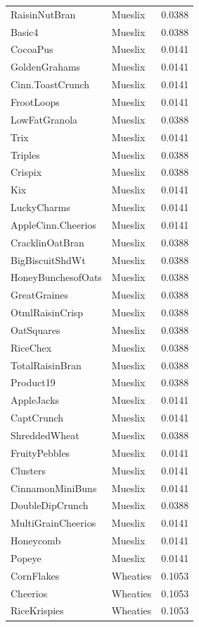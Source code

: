 \begin{longtable}{llr}
RaisinNutBran & Mueslix & 0.0388 \\
Basic4 & Mueslix & 0.0388 \\
CocoaPus & Mueslix & 0.0141 \\
GoldenGrahams & Mueslix & 0.0141 \\
Cinn.ToastCrunch & Mueslix & 0.0141 \\
FrootLoops & Mueslix & 0.0141 \\
LowFatGranola & Mueslix & 0.0388 \\
Trix & Mueslix & 0.0141 \\
Triples & Mueslix & 0.0388 \\
Crispix & Mueslix & 0.0388 \\
Kix & Mueslix & 0.0141 \\
LuckyCharms & Mueslix & 0.0141 \\
AppleCinn.Cheerios & Mueslix & 0.0141 \\
CracklinOatBran & Mueslix & 0.0388 \\
BigBiscuitShdWt & Mueslix & 0.0388 \\
HoneyBunchesofOats & Mueslix & 0.0388 \\
GreatGraines & Mueslix & 0.0388 \\
OtmlRaisinCrisp & Mueslix & 0.0388 \\
OatSquares & Mueslix & 0.0388 \\
RiceChex & Mueslix & 0.0388 \\
TotalRaisinBran & Mueslix & 0.0388 \\
Product19 & Mueslix & 0.0388 \\
AppleJacks & Mueslix & 0.0141 \\
CaptCrunch & Mueslix & 0.0141 \\
ShreddedWheat & Mueslix & 0.0388 \\
FruityPebbles & Mueslix & 0.0141 \\
Clusters & Mueslix & 0.0141 \\
CinnamonMiniBuns & Mueslix & 0.0141 \\
DoubleDipCrunch & Mueslix & 0.0388 \\
MultiGrainCheerios & Mueslix & 0.0141 \\
Honeycomb & Mueslix & 0.0141 \\
Popeye & Mueslix & 0.0141 \\
CornFlakes & Wheaties & 0.1053 \\
Cheerios & Wheaties & 0.1053 \\
RiceKrispies & Wheaties & 0.1053 \\

\end{longtable}
